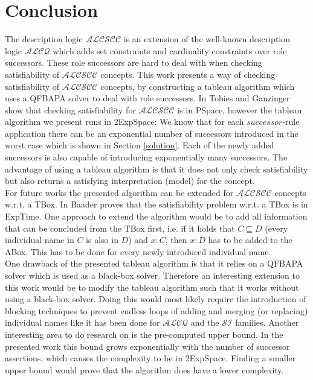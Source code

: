 \documentclass{book}
\theoremstyle{break}
\theoremstyle{definition}
\begin{document}
\chapter{Conclusion}
The description logic $\mathcal{ALCSCC}$ is an extension of the well-known description logic $\mathcal{ALCQ}$ which adds set constraints and cardinality constraints over role successors. These role successors are   hard to deal with when checking satisfiability of $\mathcal{ALCSCC}$ concepts. This work presents a way of checking satisfiability of $\mathcal{ALCSCC}$ concepts, by constructing a tableau algorithm which uses a QFBAPA solver to deal with role successors. In \cite{pspace} Tobies and Ganzinger show that checking satisfiability for $\mathcal{ALCSCC}$ is in PSpace, however the tableau algorithm we present runs in 2ExpSpace: We know that for each $successor$-rule application there can be an exponential number of successors introduced in the worst case which is shown in Section \ref{solution}. Each of the newly added successors is also capable of introducing exponentially many successors. The advantage of using a tableau algorithm is that it does not only check satisfiability but also returns a satisfying interpretation (model) for the concept.\\
For future works the presented algorithm can be extended for $\mathcal{ALCSCC}$ concepts w.r.t. a TBox. In \cite{4} Baader proves that the satisfiability problem w.r.t. a TBox is in ExpTime. One approach to extend the algorithm would be to add all information that can be concluded from the TBox first, i.e. if it holds that $C\sqsubseteq D$ (every individual name in $C$ is also in $D$) and $x:C$, then $x:D$ has to be added to the ABox. This has to be done for every newly introduced individual name.\\
One drawback of the presented tableau algorithm is that it relies on a QFBAPA solver which is used as a black-box solver. Therefore an interesting extension to this work would be to modify the tableau algorithm such that it works without using a black-box solver. Doing this would most likely require the introduction of blocking techniques to prevent endless loops of adding and merging (or replacing) individual names like it has been done for $\mathcal{ALCQ}$ and the $\mathcal{SI}$ families. Another interesting area to do research on is the pre-computed upper bound. In the presented work this bound grows exponentially with the number of successor assertions, which causes the complexity to be in 2ExpSpace. Finding a smaller upper bound would prove that the algorithm does have a lower complexity.
\normalem


\end{document}
